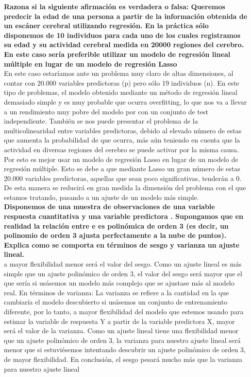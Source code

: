 \textbf{Razona si la siguiente afirmación es verdadera o falsa:
Queremos predecir la edad de una persona a partir de la información obtenida de un escáner cerebral utilizando regresión. En la práctica
sólo disponemos de 10 individuos para cada uno de los cuales registramos su edad y su actividad cerebral medida en 20000 regiones del
cerebro. En este caso sería preferible utilizar un modelo de regresión lineal múltiple en lugar de un modelo de regresión Lasso} \\

En este caso estaríamos ante un problema muy claro de altas dimensiones, al contar con 20.000 variables predictoras (p) pero sólo 19
individuos (n). En este tipo de problemas, el modelo obtenido mediante un método de regresión lineal demasiado simple y es muy
probable que ocurra overfitting, lo que nos va a llevar a un rendimiento muy pobre del modelo por con un conjunto de test independiente.
También se nos puede presentar el problema de la multicolinearidad entre variables predictoras, debido al elevado número de estas que
aumenta la probabilidad de que ocurra, más aún teniendo en cuenta que la actividad en diversas regiones del cerebro se puede activar por
la misma causa.
Por esto es mejor usar un modelo de regresión Lasso en lugar de un modelo de regresión múltiple. Esto se debe a que mediante Lasso un
gran número de estas 20.000 variables predictoras, aquellas que sean poco significativas, tenderán a 0. De esta manera se reducirá en gran
medida la dimensión del problema con el que estamos tratando, pasando a un ajuste de un modelo más simple. \\


\textbf{Disponemos de una muestra de observaciones de una variable respuesta cuantitativa y una variable predictora . Supongamos
que en realidad la relación entre e es polinómica de orden 3 (es decir, un polinomio de orden 3 ajusta perfectamente a la nube de
puntos). Explica como se comporta en términos de sesgo y varianza un ajuste lineal.} \\

a mayor flexibilidad menor será el valor del sesgo.
Como un ajuste lineal es más simple que un ajuste polinómico de orden 3, el valor del sesgo será mayor que el que sería si usásemos un
modelo más complejo que se ajustase más al modelo real.
En términos de varianza:
La varianza se refiere a la cantidad en la que cambiaría el modelo descubierto si usásemos un conjunto de entrenamiento diferente, por
lo tanto, a mayor flexibilidad del modelo que estemos usando para estimar la variable de respuesta Y a partir de la variable predictora X,
mayor será el valor de la varianza.
Como un ajuste lineal tiene una flexibilidad menor que un ajuste polinómico de orden 3, la varianza para nuestro ajuste lineal será menor
que si estuviésemos intentando descubrir un ajuste polinómico de orden 3, de mayor flexibilidad.
En conclusión, el sesgo pesará mucho más que la varianza para nuestro ajuste lineal \\

